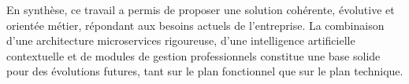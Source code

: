\vspace{1cm}

En synthèse, ce travail a permis de proposer une solution cohérente, évolutive et orientée métier, répondant aux besoins actuels de l'entreprise. La combinaison d'une architecture microservices rigoureuse, d'une intelligence artificielle contextuelle et de modules de gestion professionnels constitue une base solide pour des évolutions futures, tant sur le plan fonctionnel que sur le plan technique.

